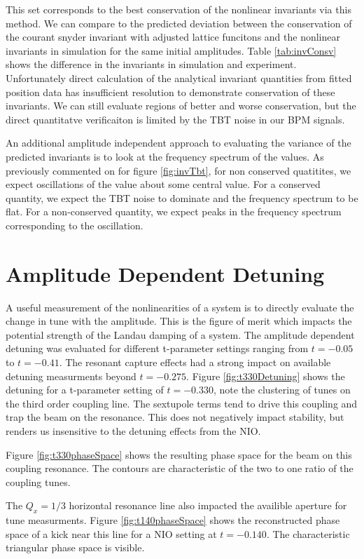 This set corresponds to the best conservation of the nonlinear invariants via this method. We can compare to the predicted deviation between the conservation of the courant snyder invariant with adjusted lattice funcitons and the nonlinear invariants in simulation for the same initial amplitudes. Table \ref{tab:invConsv} shows the difference in the invariants in simulation and experiment. Unfortunately direct calculation of the analytical invariant quantities from fitted position data has insufficient resolution to demonstrate conservation of these invariants. We can still evaluate regions of better and worse conservation, but the direct quantitatve verificaiton is limited by the TBT noise in our BPM signals.


An additional amplitude independent approach to evaluating the variance of the predicted invariants is to look at the frequency spectrum of the values. As previously commented on for figure \ref{fig:invTbt}, for non conserved quatitites, we expect oscillations of the value about some central value. For a conserved quantity, we expect the TBT noise to dominate and the frequency spectrum to be flat. For a non-conserved quantity, we expect peaks in the frequency spectrum corresponding to the oscillation.


\section{Amplitude Dependent Detuning} \label{sec:ampDetune}
A useful measurement of the nonlinearities of a system is to directly evaluate the change in tune with the amplitude. This is the figure of merit which impacts the potential strength of the Landau damping of a system. The amplitude dependent detuning was evaluated for different t-parameter settings ranging from $t=-0.05$ to $t=-0.41$. The resonant capture effects had a strong impact on available detuning measurments beyond $t=-0.275$. Figure \ref{fig:t330Detuning} shows the detuning for a t-parameter setting of $t=-0.330$, note the clustering of tunes on the third order coupling line. The sextupole terms tend to drive this coupling and trap the beam on the resonance. This does not negatively impact stability, but renders us insensitive to the detuning effects from the NIO.

Figure \ref{fig:t330phaseSpace} shows the resulting phase space for the beam on this coupling resonance. The contours are characteristic of the two to one ratio of the coupling tunes.

The $Q_x = 1/3$ horizontal resonance line also impacted the availible aperture for tune measurments. Figure \ref{fig:t140phaseSpace} shows the reconstructed phase space of a kick near this line for a NIO setting at $t=-0.140$. The characteristic triangular phase space is visible.

